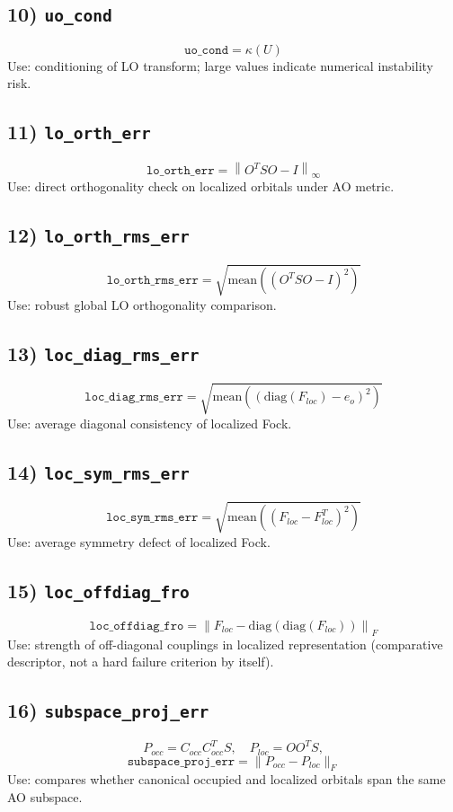 \documentclass[11pt]{article}
\begin{document}
\subsection*{10) \texttt{uo\_cond}}
\[
\texttt{uo\_cond}=\kappa(U)
\]
Use: conditioning of LO transform; large values indicate numerical instability risk.

\subsection*{11) \texttt{lo\_orth\_err}}
\[
\texttt{lo\_orth\_err}=\left\|O^TSO-I\right\|_\infty
\]
Use: direct orthogonality check on localized orbitals under AO metric.

\subsection*{12) \texttt{lo\_orth\_rms\_err}}
\[
\texttt{lo\_orth\_rms\_err}=\sqrt{\mathrm{mean}\left((O^TSO-I)^2\right)}
\]
Use: robust global LO orthogonality comparison.

\subsection*{13) \texttt{loc\_diag\_rms\_err}}
\[
\texttt{loc\_diag\_rms\_err}=\sqrt{\mathrm{mean}\left((\mathrm{diag}(F_{loc})-e_o)^2\right)}
\]
Use: average diagonal consistency of localized Fock.

\subsection*{14) \texttt{loc\_sym\_rms\_err}}
\[
\texttt{loc\_sym\_rms\_err}=\sqrt{\mathrm{mean}\left((F_{loc}-F_{loc}^T)^2\right)}
\]
Use: average symmetry defect of localized Fock.

\subsection*{15) \texttt{loc\_offdiag\_fro}}
\[
\texttt{loc\_offdiag\_fro}=\left\|F_{loc}-\mathrm{diag}(\mathrm{diag}(F_{loc}))\right\|_F
\]
Use: strength of off-diagonal couplings in localized representation (comparative descriptor, not a hard failure criterion by itself).

\subsection*{16) \texttt{subspace\_proj\_err}}
\[
P_{occ}=C_{occ}C_{occ}^TS,\quad P_{loc}=OO^TS,
\]
\[
\texttt{subspace\_proj\_err}=\|P_{occ}-P_{loc}\|_F
\]
Use: compares whether canonical occupied and localized orbitals span the same AO subspace.
\end{document}
